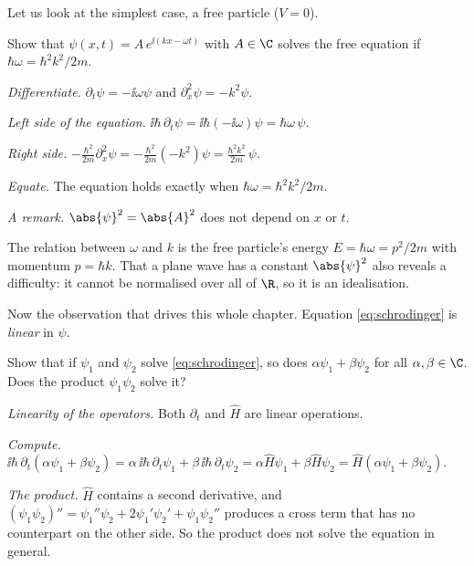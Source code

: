 Let us look at the simplest case, a free particle ($V=0$).

\begin{example}\label{ex:planewave}
  Show that $\psi(x,t)=A\,e^{\ii(kx-\omega t)}$ with $A\in\C$ solves the free equation if $\hbar\omega=\hbar^2k^2/2m$.
\end{example}
\begin{solution}
  \begin{steps}
    \item \emph{Differentiate.} $\partial_t\psi=-\ii\omega\psi$ and $\partial_x^2\psi=-k^2\psi$.
    \item \emph{Left side of the equation.} $\ii\hbar\,\partial_t\psi=\ii\hbar(-\ii\omega)\psi=\hbar\omega\,\psi$.
    \item \emph{Right side.} $-\frac{\hbar^2}{2m}\partial_x^2\psi=-\frac{\hbar^2}{2m}(-k^2)\psi=\frac{\hbar^2k^2}{2m}\,\psi$.
    \item \emph{Equate.} The equation holds exactly when $\hbar\omega=\hbar^2k^2/2m$.
    \item \emph{A remark.} $\abs{\psi}^2=\abs{A}^2$ does not depend on $x$ or $t$.
  \end{steps}
\end{solution}

The relation between $\omega$ and $k$ is the free particle's energy $E=\hbar\omega=p^2/2m$ with momentum $p=\hbar k$. That a plane wave has a constant $\abs{\psi}^2$ also reveals a difficulty: it cannot be normalised over all of $\R$, so it is an idealisation.

Now the observation that drives this whole chapter. Equation \eqref{eq:schrodinger} is \emph{linear} in $\psi$.

\begin{example}\label{ex:linear-schrodinger}
  Show that if $\psi_1$ and $\psi_2$ solve \eqref{eq:schrodinger}, so does $\alpha\psi_1+\beta\psi_2$ for all $\alpha,\beta\in\C$. Does the product $\psi_1\psi_2$ solve it?
\end{example}
\begin{solution}
  \begin{steps}
    \item \emph{Linearity of the operators.} Both $\partial_t$ and $\hat H$ are linear operations.
    \item \emph{Compute.} $\ii\hbar\,\partial_t(\alpha\psi_1+\beta\psi_2)=\alpha\,\ii\hbar\,\partial_t\psi_1+\beta\,\ii\hbar\,\partial_t\psi_2=\alpha\hat H\psi_1+\beta\hat H\psi_2=\hat H(\alpha\psi_1+\beta\psi_2)$.
    \item \emph{The product.} $\hat H$ contains a second derivative, and $(\psi_1\psi_2)''=\psi_1''\psi_2+2\psi_1'\psi_2'+\psi_1\psi_2''$ produces a cross term that has no counterpart on the other side. So the product does not solve the equation in general.
  \end{steps}
\end{solution}

